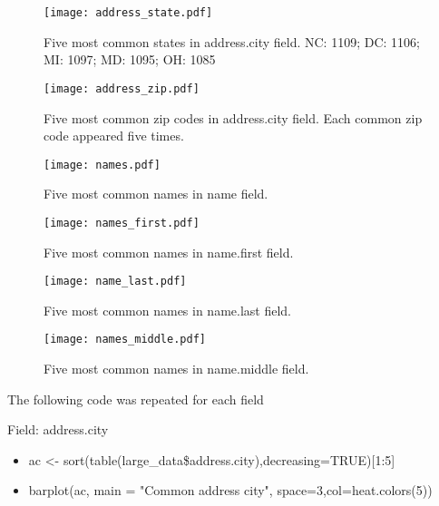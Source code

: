\documentclass[12pt,fleqn]{report} %
\begin{document}
\begin{figure}[h]
    \centering
    \texttt{[image: address\_state.pdf]}
    \caption{Five most common states in address.city field. NC: 1109; DC: 1106; MI: 1097; MD: 1095; OH: 1085}
    \label{fig:address.state}
\end{figure}

\begin{figure}[h]
    \centering
    \texttt{[image: address\_zip.pdf]}
    \caption{Five most common zip codes in address.city field. Each common zip code appeared five times.}
    \label{fig:address.zip}
\end{figure}

\begin{figure}[h]
    \centering
    \texttt{[image: names.pdf]}
    \caption{Five most common names in name field.}
    \label{fig:names}
\end{figure}

\begin{figure}[h]
    \centering
    \texttt{[image: names\_first.pdf]}
    \caption{Five most common names in name.first field.}
    \label{fig:names.first}
\end{figure}

\begin{figure}[h]
    \centering
    \texttt{[image: name\_last.pdf]}
    \caption{Five most common names in name.last field.}
    \label{fig:names.last}
\end{figure}

\begin{figure}[h]
    \centering
    \texttt{[image: names\_middle.pdf]}
    \caption{Five most common names in name.middle field.}
    \label{fig:names.middle}
\end{figure}

The following code was repeated for each field 
\begin{remark}
Field: address.city
    \begin{itemize}
    	\item ac <- sort(table(large\_data\$address.city),decreasing=TRUE)[1:5]
    	\item barplot(ac, main = "Common address city", space=3,col=heat.colors(5))

    \end{itemize}
\end{remark}


\end{document}
